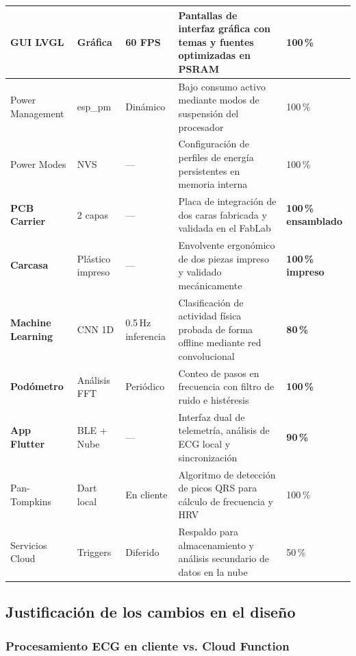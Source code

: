 \documentclass[letterpaper,11pt]{article}
\begin{document}
\begin{longtable}{|L{2.6cm}|L{2.0cm}|L{2.6cm}|L{4.6cm}|L{2.0cm}|}
GUI LVGL & Gráfica & 60 FPS & Pantallas de interfaz gráfica con temas y fuentes optimizadas en PSRAM & 100\,\% \\ \hline
Power Management & esp\_pm & Dinámico & Bajo consumo activo mediante modos de suspensión del procesador & 100\,\% \\ \hline
Power Modes & NVS & --- & Configuración de perfiles de energía persistentes en memoria interna & 100\,\% \\ \hline
\textbf{PCB Carrier} & 2 capas & --- & Placa de integración de dos caras fabricada y validada en el FabLab & \textbf{100\,\% ensamblado} \\ \hline
\textbf{Carcasa} & Plástico impreso & --- & Envolvente ergonómico de dos piezas impreso y validado mecánicamente & \textbf{100\,\% impreso} \\ \hline
\textbf{Machine Learning} & CNN 1D & 0.5\,Hz inferencia & Clasificación de actividad física probada de forma offline mediante red convolucional & \textbf{80\,\%} \\ \hline
\textbf{Podómetro} & Análisis FFT & Periódico & Conteo de pasos en frecuencia con filtro de ruido e histéresis & \textbf{100\,\%} \\ \hline
\textbf{App Flutter} & BLE + Nube & --- & Interfaz dual de telemetría, análisis de ECG local y sincronización & \textbf{90\,\%} \\ \hline
Pan-Tompkins & Dart local & En cliente & Algoritmo de detección de picos QRS para cálculo de frecuencia y HRV & 100\,\% \\ \hline
Servicios Cloud & Triggers & Diferido & Respaldo para almacenamiento y análisis secundario de datos en la nube & 50\,\% \\ \hline
\end{longtable}

\subsection{Justificación de los cambios en el diseño}

\subsubsection{Procesamiento ECG en cliente vs. Cloud Function}
\end{document}

